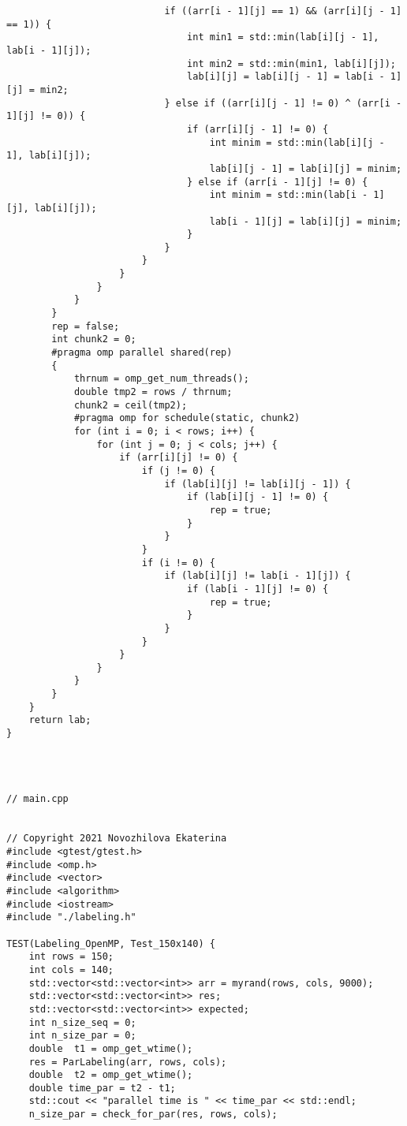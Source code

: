 \documentclass{report}
\begin{document}
\begin{lstlisting}
                            if ((arr[i - 1][j] == 1) && (arr[i][j - 1] == 1)) {
                                int min1 = std::min(lab[i][j - 1], lab[i - 1][j]);
                                int min2 = std::min(min1, lab[i][j]);
                                lab[i][j] = lab[i][j - 1] = lab[i - 1][j] = min2;
                            } else if ((arr[i][j - 1] != 0) ^ (arr[i - 1][j] != 0)) {
                                if (arr[i][j - 1] != 0) {
                                    int minim = std::min(lab[i][j - 1], lab[i][j]);
                                    lab[i][j - 1] = lab[i][j] = minim;
                                } else if (arr[i - 1][j] != 0) {
                                    int minim = std::min(lab[i - 1][j], lab[i][j]);
                                    lab[i - 1][j] = lab[i][j] = minim;
                                }
                            }
                        }
                    }
                }
            }
        }
        rep = false;
        int chunk2 = 0;
        #pragma omp parallel shared(rep)
        {
            thrnum = omp_get_num_threads();
            double tmp2 = rows / thrnum;
            chunk2 = ceil(tmp2);
            #pragma omp for schedule(static, chunk2)
            for (int i = 0; i < rows; i++) {
                for (int j = 0; j < cols; j++) {
                    if (arr[i][j] != 0) {
                        if (j != 0) {
                            if (lab[i][j] != lab[i][j - 1]) {
                                if (lab[i][j - 1] != 0) {
                                    rep = true;
                                }
                            }
                        }
                        if (i != 0) {
                            if (lab[i][j] != lab[i - 1][j]) {
                                if (lab[i - 1][j] != 0) {
                                    rep = true;
                                }
                            }
                        }
                    }
                }
            }
        }
    }
    return lab;
}




// main.cpp


// Copyright 2021 Novozhilova Ekaterina
#include <gtest/gtest.h>
#include <omp.h>
#include <vector>
#include <algorithm>
#include <iostream>
#include "./labeling.h"

TEST(Labeling_OpenMP, Test_150x140) {
    int rows = 150;
    int cols = 140;
    std::vector<std::vector<int>> arr = myrand(rows, cols, 9000);
    std::vector<std::vector<int>> res;
    std::vector<std::vector<int>> expected;
    int n_size_seq = 0;
    int n_size_par = 0;
    double  t1 = omp_get_wtime();
    res = ParLabeling(arr, rows, cols);
    double  t2 = omp_get_wtime();
    double time_par = t2 - t1;
    std::cout << "parallel time is " << time_par << std::endl;
    n_size_par = check_for_par(res, rows, cols);


\end{lstlisting}
\end{document}
